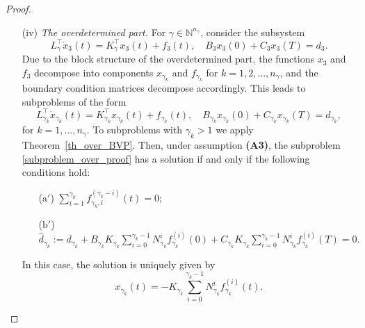\documentclass[preprint,12pt]{elsarticle}
\numberwithin{equation}{section}
\theoremstyle{definition}
\begin{document}
\begin{proof}
\begin{itemize}
\noindent
In the case when all $\beta_k=1$, i.e., $|\beta|=n_\beta$, 
the solution of problem \eqref{under_BVP_gen_proof} consists solely of arbitrary continuous components:
\begin{equation*}
    x_2(t)=\left(\varphi_1(t),\ldots,\varphi_{n_\beta}(t)\right)^\top=\widetilde{\varphi}(t),
\end{equation*}
which must only satisfy the boundary condition in \eqref{under_BVP_gen_proof}:
\begin{equation*}
    \widehat{d}_2:=d_2-B_2\widetilde{\varphi}(0)-C_2\widetilde{\varphi}(T)=0.
\end{equation*}


\item[(iv)] \emph{The overdetermined part.} For $\gamma \in \mathbb{N}^{n_{\gamma}}$, consider the subsystem
\begin{equation}\label{over_BVP_gen_proof}
L_{\gamma}^\top\dot{x}_3(t)=K_{\gamma}^\top x_3(t)+f_3(t),
\quad    B_3x_3(0)+C_3x_3(T)=d_3.
\end{equation}
Due to the block structure of the overdetermined part, the functions $x_3$ and $f_3$ decompose into components $x_{\gamma_k}$ and $f_{\gamma_k}$ for $k = 1, 2, \ldots, n_\gamma$, and the boundary condition matrices decompose accordingly. 
This leads to subproblems of the form
\begin{equation}\label{subproblem_over_proof}
    L_{\gamma_k}^\top \dot{x}_{\gamma_k}(t)=K_{\gamma_k}^\top x_{\gamma_k}(t) + f_{\gamma_k}(t) , \quad B_{\gamma_k} x_{\gamma_k}(0) + C_{\gamma_k} x_{\gamma_k}(T) = d_{\gamma_k}, 
\end{equation}
for $k = 1, \ldots, n_\gamma$. To subproblems with $\gamma_k > 1$ we apply Theorem~\ref{th_over_BVP}. Then, under assumption \textbf{(A3)}, the subproblem \eqref{subproblem_over_proof} has a solution if and only if the following conditions hold:
\begin{itemize}
        \item[($\text{a}'$)] $\sum\limits_{i=1}^{\gamma_k}f_{\gamma_k,i}^{(\gamma_k-i)}(t)=0$;
         \item[($\text{b}'$)]
    $\widehat{d}_{\gamma_k}:=d_{\gamma_k}+B_{\gamma_k} K_{\gamma_k}\sum\limits_{i=0}^{\gamma_k-1}N_{\gamma_k}^i f_{\gamma_k}^{(i)}(0)+C_{\gamma_k}K_{\gamma_k}\sum\limits_{i=0}^{\gamma_k-1}N_{\gamma_k}^i f_{\gamma_k}^{(i)}(T)=0.$
        \end{itemize}

In this case, the solution is uniquely given by
\[
    x_{\gamma_k}(t) = -K_{\gamma_k}\sum\limits_{i=0}^{\gamma_k-1}N_{\gamma_k}^i f_{\gamma_k}^{(i)}(t).
\]


\end{itemize}
\end{proof}
\end{document}
